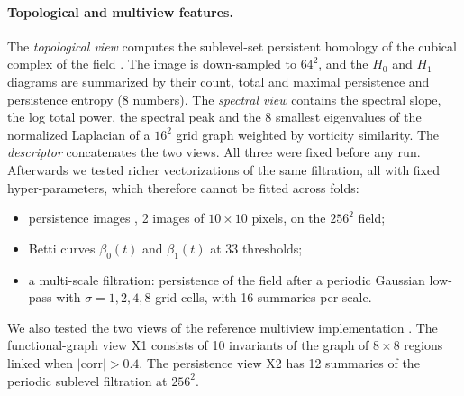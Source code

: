 \documentclass[11pt,a4paper]{article}
\begin{document}
\paragraph{Topological and multiview features.} The \emph{topological view}
computes the sublevel-set persistent homology of the cubical complex of the
field \cite{gudhi}. The image is down-sampled to $64^2$, and the $H_0$ and
$H_1$ diagrams are summarized by their count, total and maximal persistence
and persistence entropy (8 numbers). The \emph{spectral view} contains the
spectral slope, the log total power, the spectral peak and the 8 smallest
eigenvalues of the normalized Laplacian of a $16^2$ grid graph weighted by
vorticity similarity. The \emph{descriptor} concatenates
the two views. All three were fixed before any run. Afterwards we tested
richer vectorizations of the same filtration, all with fixed
hyper-parameters, which therefore cannot be fitted across folds:
\begin{itemize}
\item persistence images \cite{adams2017}, 2 images of $10\times10$ pixels, on the $256^2$ field;
\item Betti curves $\beta_0(t)$ and $\beta_1(t)$ at 33 thresholds;
\item a multi-scale filtration: persistence of the field after a periodic
  Gaussian low-pass with $\sigma=1,2,4,8$ grid cells, with 16 summaries per
  scale.
\end{itemize}
We also tested the two views of the reference multiview implementation
\cite{multiview}. The functional-graph view X1 consists of 10 invariants of
the graph of $8\times8$ regions linked when $|\mathrm{corr}|>0.4$. The
persistence view X2 has 12 summaries of the periodic sublevel filtration at
$256^2$.
\end{document}
